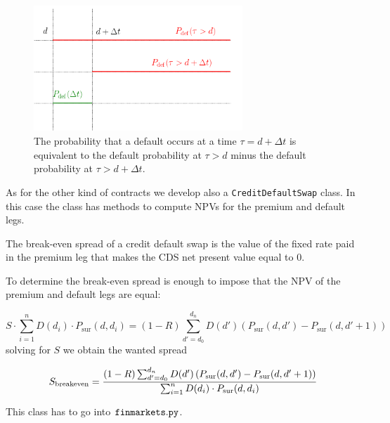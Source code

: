 \begin{figure}[htb]
\centering
\includegraphics[width=0.7\textwidth]{figures/timeline.png}
\caption{The probability that a default occurs at a time $\tau = d+\Delta t$ is equivalent to the default probability at $\tau > d$ minus the default probability at $\tau>d+\Delta t$.}
\label{fig:default_p}
\end{figure}

\begin{finmarkets}
As for the other kind of contracts we develop also a \texttt{CreditDefaultSwap} class. In this case the class has methods to compute NPVs for the premium and default legs. 

The break-even spread of a credit default swap is the value of the fixed rate paid in the premium leg that makes the CDS net present value equal to 0.

To determine the break-even spread is enough to impose that the NPV of the premium and default legs are equal:

\begin{equation}
S \cdot\sum_{i=1}^{n} D(d_i) \cdot P_{\textrm{sur}}(d, d_i)
= (1-R) \sum_{d'=d_0}^{d_n} D(d') \left( P_{\textrm{sur}}(d, d') - P_{\textrm{sur}}(d, d'+1) \right)
\end{equation}
solving for $S$ we obtain the wanted spread

\begin{equation}
S_{\mathrm{breakeven}} = \cfrac{(1-R) \sum_{d'=d_0}^{d_n} D(d') \left( P_{\textrm{sur}}(d, d') - P_{\textrm{sur}}(d, d'+1) \right)}{\sum_{i=1}^{n} D(d_i) \cdot P_{\textrm{sur}}(d, d_i)}
\end{equation}

This class has to go into $\tt{finmarkets.py}$.
\end{finmarkets}


